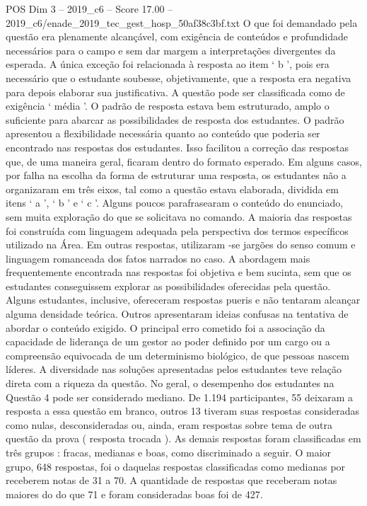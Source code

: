 \begin{textsample}{POS Dim 3 – 2019\_c6 – Score 17.00 – 2019\_c6/enade\_2019\_tec\_gest\_hosp\_50af38c3bf.txt}
O que foi demandado pela questão era plenamente alcançável, com exigência de conteúdos e profundidade necessários para o campo e sem dar margem a interpretações divergentes da esperada.
A única exceção foi relacionada à resposta ao item ‘ b ’, pois era necessário que o estudante soubesse, objetivamente, que a resposta era negativa para depois elaborar sua justificativa.
A questão pode ser classificada como de exigência ‘ média ’.
O padrão de resposta estava bem estruturado, amplo o suficiente para abarcar as possibilidades de resposta dos estudantes.
O padrão apresentou a flexibilidade necessária quanto ao conteúdo que poderia ser encontrado nas respostas dos estudantes.
Isso facilitou a correção das respostas que, de uma maneira geral, ficaram dentro do formato esperado.
Em alguns casos, por falha na escolha da forma de estruturar uma resposta, os estudantes não a organizaram em três eixos, tal como a questão estava elaborada, dividida em itens ‘ a ’, ‘ b ’ e ‘ c ’.
Alguns poucos parafrasearam o conteúdo do enunciado, sem muita exploração do que se solicitava no comando.
A maioria das respostas foi construída com linguagem adequada pela perspectiva dos termos específicos utilizado na Área.
Em outras respostas, utilizaram -se jargões do senso comum e linguagem romanceada dos fatos narrados no caso.
A abordagem mais frequentemente encontrada nas respostas foi objetiva e bem sucinta, sem que os estudantes conseguissem explorar as possibilidades oferecidas pela questão.
Alguns estudantes, inclusive, ofereceram respostas pueris e não tentaram alcançar alguma densidade teórica.
Outros apresentaram ideias confusas na tentativa de abordar o conteúdo exigido.
O principal erro cometido foi a associação da capacidade de liderança de um gestor ao poder definido por um cargo ou a compreensão equivocada de um determinismo biológico, de que pessoas nascem líderes.
A diversidade nas soluções apresentadas pelos estudantes teve relação direta com a riqueza da questão.
No geral, o desempenho dos estudantes na Questão 4 pode ser considerado mediano.
De 1.194 participantes, 55 deixaram a resposta a essa questão em branco, outros 13 tiveram suas respostas consideradas como nulas, desconsideradas ou, ainda, eram respostas sobre tema de outra questão da prova ( resposta trocada ).
As demais respostas foram classificadas em três grupos : fracas, medianas e boas, como discriminado a seguir.
O maior grupo, 648 respostas, foi o daquelas respostas classificadas como medianas por receberem notas de 31 a 70.
A quantidade de respostas que receberam notas maiores do do que 71 e foram consideradas boas foi de 427.

\end{textsample}
